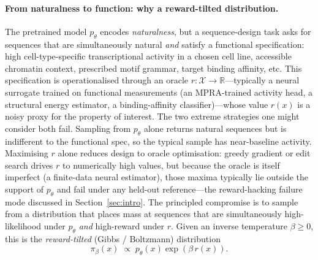 \documentclass{article}
\theoremstyle{definition}
\theoremstyle{remark}
\newcommand{\R}{\mathbb{R}}
\begin{document}
\paragraph{From naturalness to function: why a reward-tilted distribution.}
The pretrained model $p_\theta$ encodes \emph{naturalness}, but a sequence-design task asks for sequences that are simultaneously natural \emph{and} satisfy a functional specification: high cell-type-specific transcriptional activity in a chosen cell line, accessible chromatin context, prescribed motif grammar, target binding affinity, etc. This specification is operationalised through an oracle $r:\mathcal{X}\!\to\!\R$---typically a neural surrogate trained on functional measurements (an MPRA-trained activity head, a structural energy estimator, a binding-affinity classifier)---whose value $r(x)$ is a noisy proxy for the property of interest. The two extreme strategies one might consider both fail. Sampling from $p_\theta$ alone returns natural sequences but is indifferent to the functional spec, so the typical sample has near-baseline activity. Maximising $r$ alone reduces design to oracle optimisation: greedy gradient or edit search drives $r$ to numerically high values, but because the oracle is itself imperfect (a finite-data neural estimator), those maxima typically lie outside the support of $p_\theta$ and fail under any held-out reference---the reward-hacking failure mode discussed in Section~\ref{sec:intro}. The principled compromise is to sample from a distribution that places mass at sequences that are simultaneously high-likelihood under $p_\theta$ \emph{and} high-reward under $r$. Given an inverse temperature $\beta\!\geq\!0$, this is the \emph{reward-tilted} (Gibbs / Boltzmann) distribution
\begin{equation}\label{eq:tilted}
    \pi_\beta(x) \;\propto\; p_\theta(x)\exp(\beta\,r(x)).
\end{equation}
\end{document}
